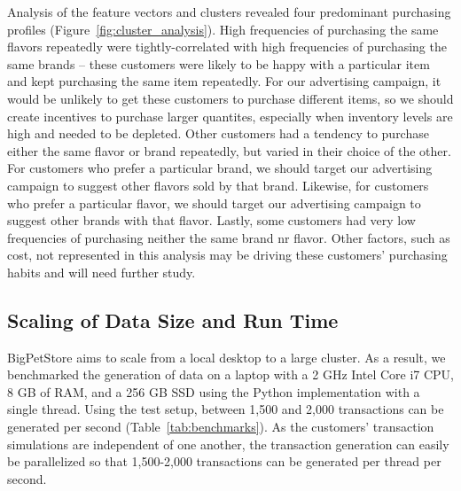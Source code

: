 \documentclass[conference]{IEEEtran}
\begin{document}
Analysis of the feature vectors and clusters revealed four predominant purchasing profiles (Figure~\ref{fig:cluster_analysis}).  High frequencies of purchasing the same flavors repeatedly were tightly-correlated with high frequencies of purchasing the same brands -- these customers were likely to be happy with a particular item and kept purchasing the same item repeatedly.  For our advertising campaign, it would be unlikely to get these customers to purchase different items, so we should create incentives to purchase larger quantites, especially when inventory levels are high and needed to be depleted.  Other customers had a tendency to purchase either the same flavor or brand repeatedly, but varied in their choice of the other.  For customers who prefer a particular brand, we should target our advertising campaign to suggest other flavors sold by that brand.  Likewise, for customers who prefer a particular flavor, we should target our advertising campaign to suggest other brands with that flavor.  Lastly, some customers had very low frequencies of purchasing neither the same brand nr flavor.  Other factors, such as cost, not represented in this analysis may be driving these customers' purchasing habits and will need further study.


\subsection{Scaling of Data Size and Run Time}
BigPetStore aims to scale from a local desktop to a large cluster. As a result, we benchmarked the generation of data on a laptop with a 2 GHz Intel Core i7 CPU, 8 GB of RAM, and a 256 GB SSD using the Python implementation with a single thread. Using the test setup, between 1,500 and 2,000 transactions can be generated per second (Table~\ref{tab:benchmarks}). As the customers' transaction simulations are independent of one another, the transaction generation can easily be parallelized so that 1,500-2,000 transactions can be generated per thread per second.
\end{document}
